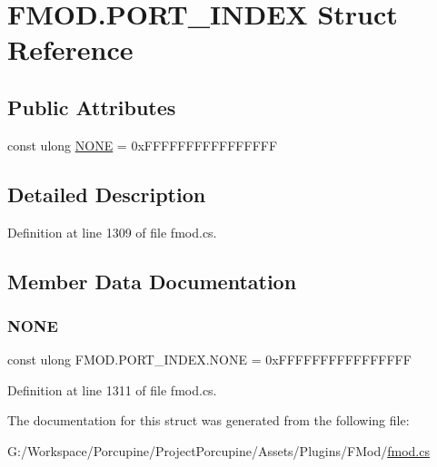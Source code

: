 \hypertarget{struct_f_m_o_d_1_1_p_o_r_t___i_n_d_e_x}{}\section{F\+M\+O\+D.\+P\+O\+R\+T\+\_\+\+I\+N\+D\+EX Struct Reference}
\label{struct_f_m_o_d_1_1_p_o_r_t___i_n_d_e_x}
\subsection*{Public Attributes}
\begin{DoxyCompactItemize}
\item 
const ulong \hyperlink{struct_f_m_o_d_1_1_p_o_r_t___i_n_d_e_x_a14fd4d39d82649ef07c097cb85bd8773}{N\+O\+NE} = 0x\+F\+F\+F\+F\+F\+F\+F\+F\+F\+F\+F\+F\+F\+F\+FF
\end{DoxyCompactItemize}


\subsection{Detailed Description}


Definition at line 1309 of file fmod.\+cs.



\subsection{Member Data Documentation}
\mbox{\label{struct_f_m_o_d_1_1_p_o_r_t___i_n_d_e_x_a14fd4d39d82649ef07c097cb85bd8773}} 
\subsubsection{\texorpdfstring{N\+O\+NE}{NONE}}
{\footnotesize\ttfamily const ulong F\+M\+O\+D.\+P\+O\+R\+T\+\_\+\+I\+N\+D\+E\+X.\+N\+O\+NE = 0x\+F\+F\+F\+F\+F\+F\+F\+F\+F\+F\+F\+F\+F\+F\+FF}



Definition at line 1311 of file fmod.\+cs.



The documentation for this struct was generated from the following file\+:\begin{DoxyCompactItemize}
\item 
G\+:/\+Workspace/\+Porcupine/\+Project\+Porcupine/\+Assets/\+Plugins/\+F\+Mod/\hyperlink{fmod_8cs}{fmod.\+cs}\end{DoxyCompactItemize}
